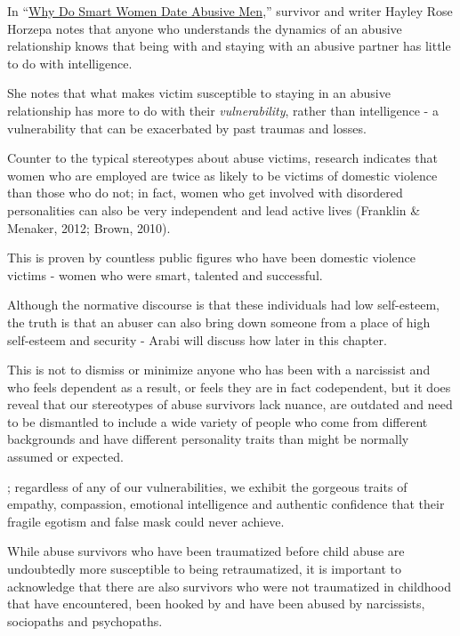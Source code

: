 \documentclass[oneside]{book}
\numberwithin{equation}{section}
\begin{document}
%
In ``\href{https://www.huffpost.com/entry/abusive-relationships-women_b_912513}{Why Do Smart Women Date Abusive Men},'' survivor and writer Hayley Rose Horzepa notes that anyone who understands the dynamics of an abusive relationship knows that being with and staying with an abusive partner has little to do with intelligence.

She notes that what makes victim susceptible to staying in an abusive relationship has more to do with their \textit{vulnerability}, rather than intelligence - a vulnerability that can be exacerbated by past traumas and losses.

Counter to the typical stereotypes about abuse victims, research indicates that women who are employed are twice as likely to be victims of domestic violence than those who do not; in fact, women who get involved with disordered personalities can also be very independent and lead active lives (Franklin \& Menaker, 2012; Brown, 2010).

This is proven by countless public figures who have been domestic violence victims - women who were smart, talented and successful.

Although the normative discourse is that these individuals had low self-esteem, the truth is that an abuser can also bring down someone from a place of high self-esteem and security - Arabi will discuss how later in this chapter.

%
This is not to dismiss or minimize anyone who has been with a narcissist and who feels dependent as a result, or feels they are in fact codependent, but it does reveal that our stereotypes of abuse survivors lack nuance, are outdated and need to be dismantled to include a wide variety of people who come from different backgrounds and have different personality traits than might be normally assumed or expected.

%
; regardless of any of our vulnerabilities, we exhibit the gorgeous traits of empathy, compassion, emotional intelligence and authentic confidence that their fragile egotism and false mask could never achieve.

%
While abuse survivors who have been traumatized before child abuse are undoubtedly more susceptible to being retraumatized, it is important to acknowledge that there are also survivors who were not traumatized in childhood that have encountered, been hooked by and have been abused by narcissists, sociopaths and psychopaths.
\end{document}
